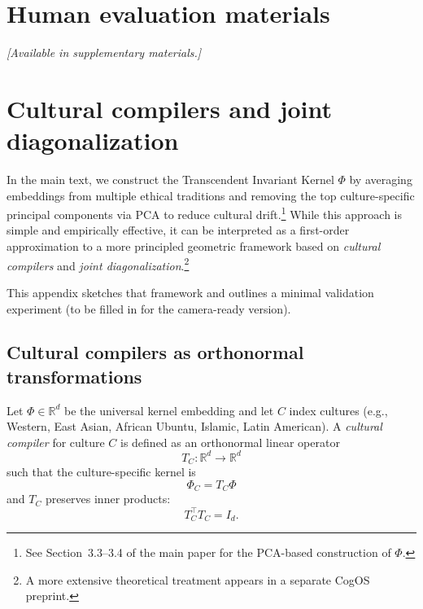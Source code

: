 \documentclass[11pt]{article}
\begin{document}

\section{Human evaluation materials}
\label{app:human-eval}

\textit{[Available in supplementary materials.]}


\section{Cultural compilers and joint diagonalization}
\label{app:cultural-compilers}

In the main text, we construct the Transcendent Invariant Kernel \(\Phi\) by averaging embeddings from multiple ethical traditions and removing the top culture-specific principal components via PCA to reduce cultural drift.\footnote{See Section~3.3--3.4 of the main paper for the PCA-based construction of \(\Phi\).} While this approach is simple and empirically effective, it can be interpreted as a first-order approximation to a more principled geometric framework based on \emph{cultural compilers} and \emph{joint diagonalization}.\footnote{A more extensive theoretical treatment appears in a separate CogOS preprint.}

This appendix sketches that framework and outlines a minimal validation experiment (to be filled in for the camera-ready version).

\subsection{Cultural compilers as orthonormal transformations}

Let \(\Phi \in \mathbb{R}^d\) be the universal kernel embedding and let \(C\) index cultures (e.g., Western, East Asian, African Ubuntu, Islamic, Latin American). A \emph{cultural compiler} for culture \(C\) is defined as an orthonormal linear operator
\[
T_C : \mathbb{R}^d \to \mathbb{R}^d
\]
such that the culture-specific kernel is
\[
\Phi_C = T_C \Phi
\]
and \(T_C\) preserves inner products:
\[
T_C^{\top} T_C = I_d.
\]
\end{document}
